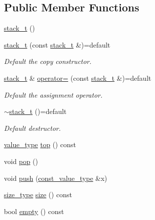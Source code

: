 \subsection*{Public Member Functions}
\begin{DoxyCompactItemize}
\item 
\hyperlink{classstk_1_1stack__t_ab7605ffb3efbfdaf23c1411dba8076d7}{stack\+\_\+t} ()
\item 
\mbox{\label{classstk_1_1stack__t_a27abcc49011f8cd22cd92395655f8ca4}} 
\hyperlink{classstk_1_1stack__t_a27abcc49011f8cd22cd92395655f8ca4}{stack\+\_\+t} (const \hyperlink{classstk_1_1stack__t}{stack\+\_\+t} \&)=default
\begin{DoxyCompactList}\small\item\em Default the copy constructor. \end{DoxyCompactList}\item 
\mbox{\label{classstk_1_1stack__t_a680884feaecd4cb19ea890893c583fdb}} 
\hyperlink{classstk_1_1stack__t}{stack\+\_\+t} \& \hyperlink{classstk_1_1stack__t_a680884feaecd4cb19ea890893c583fdb}{operator=} (const \hyperlink{classstk_1_1stack__t}{stack\+\_\+t} \&)=default
\begin{DoxyCompactList}\small\item\em Default the assignment operator. \end{DoxyCompactList}\item 
\mbox{\label{classstk_1_1stack__t_acd6dfd6efc2edad5c9bd8f126c415a69}} 
\hyperlink{classstk_1_1stack__t_acd6dfd6efc2edad5c9bd8f126c415a69}{$\sim$stack\+\_\+t} ()=default
\begin{DoxyCompactList}\small\item\em Default destructor. \end{DoxyCompactList}\item 
\hyperlink{classstk_1_1stack__t_a05d1586fa8257268f0c1ade7ffc4588e}{value\+\_\+type} \hyperlink{classstk_1_1stack__t_a120f150bc90f8ccf0c0ca8396bda7c65}{top} () const
\item 
void \hyperlink{classstk_1_1stack__t_a5be99b150a46b8456643cbc40bcefca8}{pop} ()
\item 
void \hyperlink{classstk_1_1stack__t_aad7638faa441f17e91ba9a8f5663be4c}{push} (\hyperlink{classstk_1_1stack__t_a27d586bc06e0faf30a2a980cd8ffd125}{const\+\_\+value\+\_\+type} \&x)
\item 
\hyperlink{classstk_1_1stack__t_ade199c494a8e4455f76cc04faf138ed8}{size\+\_\+type} \hyperlink{classstk_1_1stack__t_a50dbd2e6626510af69ba1f38882ca1b5}{size} () const
\item 
bool \hyperlink{classstk_1_1stack__t_adb144d5de96aeeed6dee8d902158f1a6}{empty} () const
\end{DoxyCompactItemize}
